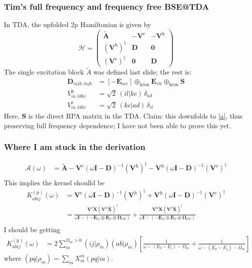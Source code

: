 \begin{frame}
\frametitle{Tim's full frequency and frequency free BSE@TDA}
In TDA, the upfolded 2p Hamiltonian is given by
\begin{equation}
\mathcal{H}=
\begin{pmatrix}
\mathbf{\tilde{A}} & -\mathbf{V}^{\mathrm{e}} & -\mathbf{V}^{\mathrm{h}} \\
\left(\mathbf{V}^{\mathrm{h}}\right)^{\dagger} & \mathbf{D} & \mathbf{0} \\
\left(\mathbf{V}^{\mathrm{e}}\right)^{\dagger} & \mathbf{0} & \mathbf{D}
\end{pmatrix}
\end{equation}
The single excitation block $\tilde{A}$ was defined last slide; the rest is:
\begin{align}
\mathbf{D}_{iajb,iajb} &= \left[-\boldsymbol{E}_{\mathrm{occ}}\right] \oplus_{\text{kron}} \boldsymbol{E}_{\mathrm{vir}} \oplus_{\text{kron}} \mathbf{S} \\
V_{ia,ldkc}^{\mathrm{h}} &= \sqrt{2}\,(il|kc)\,\delta_{ad} \\
V_{ia,ldkc}^{\mathrm{e}} &= \sqrt{2}\,(kc|ad)\,\delta_{il}
\end{align}
Here, $\mathbf{S}$ is the direct RPA matrix in the TDA. Claim: this downfolds to \ref{a}, thus preserving full frequency dependence; I have not been able to prove this yet.
\end{frame}

\begin{frame}
\frametitle{Where I am stuck in the derivation}
\begin{align}
\mathcal{A}(\omega)
&= \tilde{\mathbf{A}} - \mathbf{V}^{\mathrm{e}}(\omega \mathbf{I} - \mathbf{D})^{-1} (\mathbf{V}^{\mathrm{h}})^{\dagger} - \mathbf{V}^{\mathrm{h}}(\omega \mathbf{I} - \mathbf{D})^{-1} (\mathbf{V}^{\mathrm{e}})^{\dagger} \\
\end{align}
This implies the kernel shoulld be
\begin{align}
K_{abij}^{(\mathrm{p})}(\omega) &= \mathbf{V}^{\mathrm{e}}(\omega \mathbf{I} - \mathbf{D})^{-1} (\mathbf{V}^{\mathrm{h}})^{\dagger} + \mathbf{V}^{\mathrm{h}}(\omega \mathbf{I} - \mathbf{D})^{-1} (\mathbf{V}^{\mathrm{e}})^{\dagger} \\
&= \frac{\mathbf{V}^{\mathrm{e}} \bm{\tilde{X}}  (\bm{V}^{\mathrm{h}}\bm{\tilde{X}})^{\dagger}}{\omega \mathbf{I} - \left(-\bm{E}_O \oplus \bm{E}_V \oplus \bm{\Omega }_{OV}\right)} + \frac{\bm{V}^{\mathrm{h}} \bm{\tilde{X}}  (\bm{V}^{\mathrm{e}}\bm{\tilde{X}})^{\dagger}}{\omega \mathbf{I} - \left(-\bm{E}_O \oplus \bm{E}_V \oplus \bm{\Omega }_{OV}\right)} \\
\end{align}
I should be getting
\begin{align}
K_{abij}^{(\mathrm{p})}(\omega) &= 2 \sum_m^{\Omega_m>0}\left(i j| \rho_m\right)\left(a b|\rho_m\right)\left[\frac{1}{\omega-\left(E_b-E_i\right)-\Omega_m}+\frac{1}{\omega-\left(E_a-E_j\right)-\Omega_m}\right]
\end{align}
where $\left(p q | \rho_m\right)=\sum_{i a} X_{i a}^m(p q | i a)$.

\end{frame}
